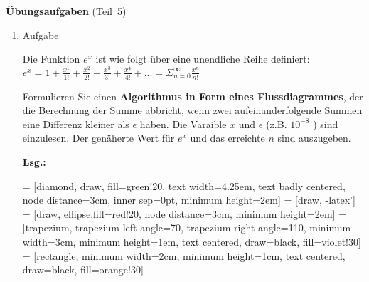\documentclass[12pt,a4paper,ngerman]{scrreprt}
\newcommand{\Lsg}{\par \textbf{Lsg.: } \hfill}
\begin{document}
\large{\textbf{Übungsaufgaben} (Teil~5)}

\begin{enumerate}

\item Aufgabe %

Die Funktion $ e^x $ ist wie folgt über eine unendliche Reihe definiert: \\

\begin{math}
e^x = 1 + \frac{x^1}{1!} + \frac{x^2}{2!} + \frac{x^3}{3!} + \frac{x^4}{4!} + ...
= \Sigma_{n=0}^{\infty} \frac{x^n}{n!}
\end{math}

\par Formulieren Sie einen \textbf{Algorithmus in Form eines Flussdiagrammes}, der die Berechnung der Summe abbricht, wenn zwei aufeinanderfolgende Summen eine Differenz kleiner als $\epsilon$ haben.
Die Varaible $x$ und $\epsilon$ (z.B. $10^{-8}$ ) sind einzulesen. Der genäherte Wert für $ e^x $ und das erreichte $ n $ sind auszugeben.

\Lsg

 = [diamond, draw, fill=green!20, 
    text width=4.25em, text badly centered, node distance=3cm, inner sep=0pt,
    minimum height=2em] 
 = [draw, -latex']
 = [draw, ellipse,fill=red!20, node distance=3cm,
    minimum height=2em]
 = [trapezium, trapezium left angle=70, trapezium right angle=110, minimum width=3cm, minimum height=1em, text centered, draw=black, fill=violet!30]
 = [rectangle, minimum width=2cm, minimum height=1cm, text centered, draw=black, fill=orange!30]
\begin{tikzpicture}[node distance = 1.5cm, auto, thick, nodes = {align = center},
    >=latex]


\end{tikzpicture}
\end{enumerate}
\end{document}
